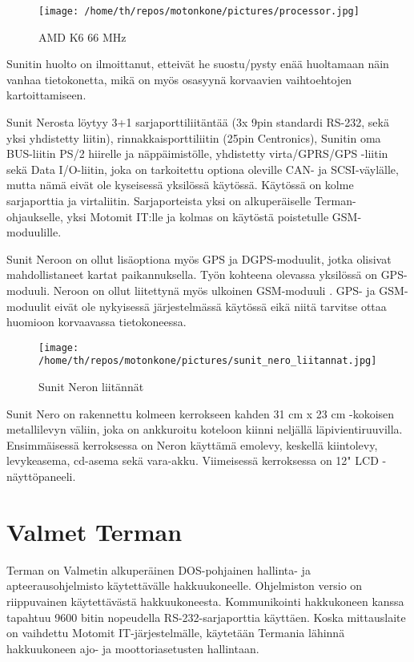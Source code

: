 \documentclass[11pt,a4paper,oneside,article]{memoir}
\begin{document}
\begin{figure}[H]
\centering
\texttt{[image: /home/th/repos/motonkone/pictures/processor.jpg]}
\caption{AMD K6 66 MHz}
\end{figure}

Sunitin huolto on ilmoittanut, etteivät he suostu/pysty enää huoltamaan näin vanhaa tietokonetta, mikä on myös osasyynä korvaavien vaihtoehtojen kartoittamiseen.

Sunit Nerosta löytyy 3+1 sarjaporttiliitäntää (3x 9pin standardi RS-232, sekä yksi yhdistetty liitin), rinnakkaisporttiliitin (25pin Centronics), Sunitin oma BUS-liitin PS/2 hiirelle ja näppäimistölle, yhdistetty virta/GPRS/GPS -liitin sekä Data I/O-liitin, joka on tarkoitettu optiona oleville CAN- ja SCSI-väylälle, mutta nämä eivät ole kyseisessä yksilössä käytössä.  Käytössä on kolme sarjaporttia ja virtaliitin. Sarjaporteista yksi on alkuperäiselle Terman-ohjaukselle, yksi Motomit IT:lle ja kolmas on käytöstä poistetulle GSM-moduulille.

Sunit Neroon on ollut lisäoptiona myös GPS ja DGPS-moduulit, jotka olisivat mahdollistaneet kartat paikannuksella. Työn kohteena olevassa yksilössä on GPS-moduuli. Neroon on ollut liitettynä myös ulkoinen GSM-moduuli \cite{nero:manual}. GPS- ja GSM-moduulit eivät ole nykyisessä järjestelmässä käytössä eikä niitä tarvitse ottaa huomioon korvaavassa tietokoneessa.\newline\newline

\begin{figure}[H]
\centering
\texttt{[image: /home/th/repos/motonkone/pictures/sunit\_nero\_liitannat.jpg]}
\caption{Sunit Neron liitännät}
\end{figure}

Sunit Nero on rakennettu kolmeen kerrokseen kahden 31 cm x 23 cm -kokoisen metallilevyn väliin, joka on ankkuroitu koteloon kiinni neljällä  läpivientiruuvilla. Ensimmäisessä kerroksessa on Neron käyttämä emolevy, keskellä kiintolevy, levykeasema, cd-asema sekä vara-akku. Viimeisessä kerroksessa on 12" LCD -näyttöpaneeli.

\section{Valmet Terman}
Terman on Valmetin alkuperäinen DOS-pohjainen hallinta- ja apteerausohjelmisto käytettävälle hakkuukoneelle. Ohjelmiston versio on riippuvainen käytettävästä hakkuukoneesta. Kommunikointi hakkukoneen kanssa tapahtuu 9600 bitin nopeudella RS-232-sarjaporttia käyttäen. Koska mittauslaite on vaihdettu Motomit IT-järjestelmälle, käytetään Termania lähinnä hakkuukoneen ajo- ja moottoriasetusten hallintaan.
\newline\newline
\end{document}
